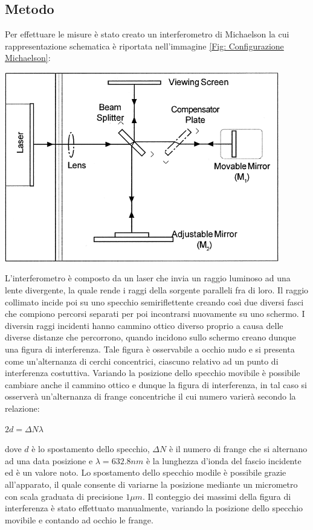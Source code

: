 \documentclass[a4paper]{article}
\begin{document}
\subsection{Metodo}
Per effettuare le misure è stato creato un interferometro di Michaelson la cui rappresentazione schematica è riportata nell'immagine \ref{Fig: Configurazione Michaelson}:
\begin{center}
	\includegraphics[width=0.9\textwidth]{grafici/configurazione michaelson.png}
\label{Fig: Configurazione Michaelson}
\end{center}
L'interferometro è composto da un laser che invia un raggio luminoso ad una lente divergente, la quale rende i raggi della sorgente paralleli fra di loro. Il raggio collimato incide poi su uno specchio semiriflettente creando così due diversi fasci che compiono percorsi separati per poi incontrarsi nuovamente su uno schermo. I diversin raggi incidenti hanno cammino ottico diverso proprio a causa delle diverse distanze che percorrono, quando incidono sullo schermo creano dunque una figura di interferenza. Tale figura è osservabile a occhio nudo e si presenta come un'alternanza di cerchi concentrici, ciascuno relativo ad un punto di interferenza costuttiva. Variando la posizione dello specchio movibile è possibile cambiare anche il cammino ottico e dunque la figura di interferenza, in tal caso si osserverà un'alternanza di frange concentriche il cui numero varierà secondo la relazione: 
\begin{center}
    $2d=\Delta N \lambda $
\end{center}
dove $d$ è lo spostamento dello specchio, $\Delta N$ è il numero di frange che si alternano ad una data posizione e $\lambda=632.8 nm$ è la lunghezza d'ionda del fascio incidente ed è un valore noto. Lo spostamento dello specchio modile è possibile grazie all'apparato, il quale consente di variarne la posizione mediante un micrometro con scala graduata di precisione $1 \mu m$. Il conteggio dei massimi della figura di interferenza è stato effettuato manualmente, variando la posizione dello specchio movibile e contando ad occhio le frange.
\end{document}
